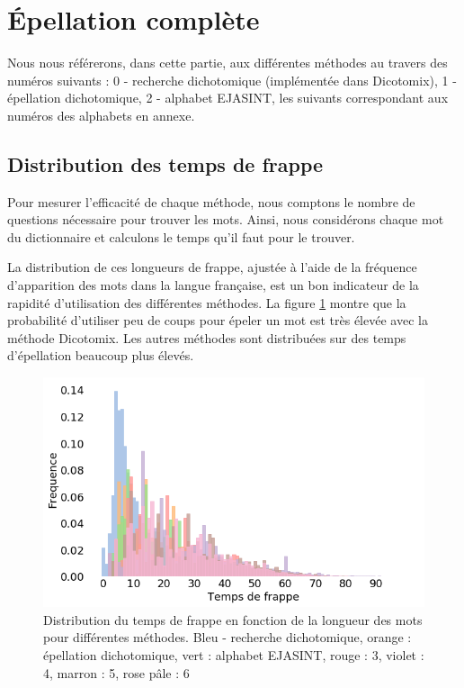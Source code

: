 \documentclass[twoside,twocolumn]{article}
\begin{document}

\section{Épellation complète}

Nous nous référerons, dans cette partie, aux différentes méthodes au travers des numéros suivants : 0 - recherche dichotomique (implémentée dans Dicotomix), 1 - épellation dichotomique, 2 - alphabet EJASINT, les suivants correspondant aux numéros des alphabets en annexe.

\subsection{Distribution des temps de frappe}

Pour mesurer l'efficacité de chaque méthode, nous comptons le nombre de questions nécessaire pour trouver les mots. Ainsi, nous considérons chaque mot du dictionnaire et calculons le temps qu'il faut pour le trouver.

La distribution de ces longueurs de frappe, ajustée à l'aide de la fréquence d'apparition des mots dans la langue française, est un bon indicateur de la rapidité d'utilisation des différentes méthodes. La figure \ref{distrib} montre que la probabilité d'utiliser peu de coups pour épeler un mot est très élevée avec la méthode Dicotomix. Les autres méthodes sont distribuées sur des temps d'épellation beaucoup plus élevés. 
\begin{center}
\begin{figure}
  \includegraphics[scale=0.35]{distrib.png}
  \caption{Distribution du temps de frappe en fonction de la longueur des mots pour différentes méthodes. Bleu - recherche dichotomique, orange : épellation dichotomique, vert : alphabet EJASINT, rouge : 3, violet : 4, marron : 5, rose pâle : 6}
  \label{distrib}
\end{figure}
\end{center}
\end{document}
